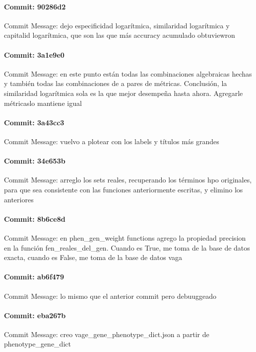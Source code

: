 \documentclass{article}
\begin{document}
\paragraph{Commit: 90286d2}
Commit Message: dejo especificidad logarítmica, similaridad logarítmica y capitalid logarítmica, que son las que más accuracy acumulado obtuviewron

\paragraph{Commit: 3a1e9e0}
Commit Message: en este punto están todas las combinaciones algebraicas hechas y también todas las combinaciones de a pares de métricas. Conclusión, la similaridad logarítmica sola es la que mejor desempeña hasta ahora. Agregarle métricaslo mantiene igual

\paragraph{Commit: 3a43cc3}
Commit Message: vuelvo a plotear con los labels y títulos más grandes

\paragraph{Commit: 34e653b}
Commit Message: arreglo los sets reales, recuperando los términos hpo originales, para que sea consistente con las funciones anteriormente escritas, y elimino los anteriores

\paragraph{Commit: 8b6ce8d}
Commit Message: en phen_gen_weight functions agrego la propiedad precision en la función fen_reales_del_gen. Cuando es True, me toma de la base de datos exacta, cuando es False, me toma de la base de datos vaga

\paragraph{Commit: ab6f479}
Commit Message: lo mismo que el anterior commit pero debuuggeado

\paragraph{Commit: eba267b}
Commit Message: creo vage_gene_phenotype_dict.json a partir de phenotype_gene_dict
\end{document}
